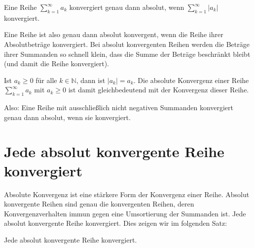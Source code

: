 \documentclass[fontsize=9pt,
               parskip=half-,
               DIV=14,
               listof=chapterentry,
               tocflat]{scrbook}
\begin{document}
\begin{definition*}
Eine Reihe $\sum _{k=1}^{\infty }a_{k}$ konvergiert genau dann absolut, wenn $\sum _{k=1}^{\infty }|a_{k}|$ konvergiert.

\end{definition*}

Eine Reihe ist also genau dann absolut konvergent, wenn die Reihe ihrer Absolutbeträge konvergiert. Bei absolut konvergenten Reihen werden die Beträge ihrer Summanden so schnell klein, dass die Summe der Beträge beschränkt bleibt (und damit die Reihe konvergiert).

\begin{hint*}
Ist $a_{k}\geq 0$ für alle $k\in \mathbb {N} $, dann ist $|a_{k}|=a_{k}$. Die absolute Konvergenz einer Reihe $\sum _{k=1}^{\infty }a_{k}$ mit $a_{k}\geq 0$ ist damit gleichbedeutend mit der Konvergenz dieser Reihe.

Also: Eine Reihe mit ausschließlich nicht negativen Summanden konvergiert genau dann absolut, wenn sie konvergiert.

\end{hint*}

\section{Jede absolut konvergente Reihe konvergiert}

Absolute Konvergenz ist eine stärkere Form der Konvergenz einer Reihe. Absolut konvergente Reihen sind genau die konvergenten Reihen, deren Konvergenzverhalten immun gegen eine Umsortierung der Summanden ist. Jede absolut konvergente Reihe konvergiert. Dies zeigen wir im folgenden Satz:

\begin{theorem*}
Jede absolut konvergente Reihe konvergiert.

\end{theorem*}
\end{document}
